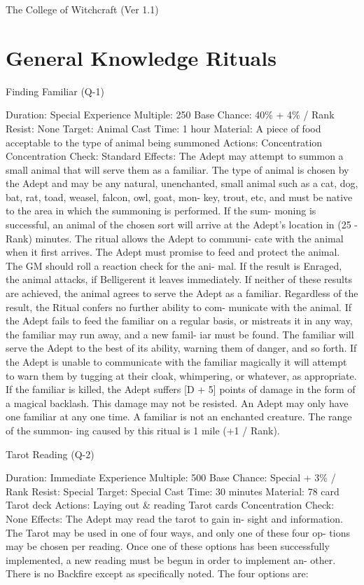 \begin{Chapter}{The College of Witchcraft (Ver 1.1)}
\section{General Knowledge Rituals}

Finding Familiar (Q-1) 

Duration: Special 
Experience Multiple: 250 
Base Chance: 40\% + 4\% / Rank 
Resist: None 
Target: Animal 
Cast Time: 1 hour 
Material: A piece of food acceptable to the type of 
animal being summoned 
Actions: Concentration 
Concentration Check: Standard 
Effects: The Adept may attempt to summon a small 
animal that will serve them as a familiar. The type 
of  animal  is  chosen  by  the  Adept  and  may  be  any 
natural,  unenchanted,  small  animal  such  as  a  cat, 
dog, bat, rat, toad, weasel, falcon, owl, goat, mon-
key,  trout,  etc,  and  must  be  native  to  the  area  in 
which  the  summoning  is  performed.  If  the  sum-
moning is successful, an animal of the chosen sort 
will  arrive  at  the  Adept’s  location  in  (25  -  Rank) 
minutes.  The  ritual  allows  the  Adept  to  communi-
cate  with  the  animal  when  it  first  arrives.  The 
Adept must promise to feed and protect the animal. 
The  GM  should  roll  a  reaction  check  for  the  ani-
mal.  If the result is Enraged, the animal attacks, if 
Belligerent  it  leaves  immediately.  If  neither  of 
these  results  are  achieved,  the  animal  agrees  to 
serve  the  Adept  as  a  familiar.  Regardless  of  the 
result, the Ritual confers no further ability to com-
municate with the animal. If the Adept fails to feed 
the familiar on a regular basis, or mistreats it in any 
way, the familiar may run away, and a new famil-
iar  must  be  found.  The  familiar  will  serve  the 
Adept  to  the  best  of  its  ability,  warning  them  of 
danger,  and  so  forth.  If  the  Adept  is  unable  to 
communicate  with  the  familiar  magically  it  will 
attempt  to  warn  them  by  tugging  at  their  cloak, 
whimpering,  or  whatever,  as  appropriate.  If  the 
familiar is killed, the Adept suffers [D + 5] points 
of damage in the form of a magical backlash. This 
damage  may  not  be  resisted.  An  Adept  may  only 
have one familiar at any one time. A familiar is not 
an  enchanted  creature.  The  range  of  the  summon-
ing caused by this ritual is 1 mile (+1 / Rank). 

Tarot Reading (Q-2) 

Duration: Immediate 
Experience Multiple: 500 
Base Chance: Special + 3\% / Rank 
Resist: Special 
Target: Special 
Cast Time: 30 minutes 
Material: 78 card Tarot deck 
Actions: Laying out \& reading Tarot cards 
Concentration Check: None 
Effects:  The  Adept  may  read  the  tarot  to  gain  in-
sight  and  information.  The  Tarot  may  be  used  in 
one  of  four  ways,  and  only  one  of  these  four  op-
tions may be chosen per reading. Once one of these 
options has  been  successfully  implemented, a new 
reading  must  be  begun  in  order  to  implement  an-
other.  There  is  no  Backfire  except  as  specifically 
noted. The four options are: 


\end{Chapter}
